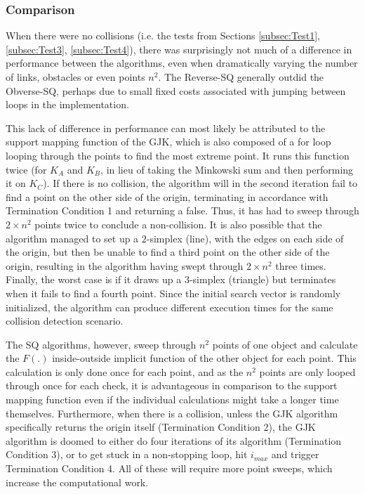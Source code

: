 \subsubsection{Comparison}

When there were no collisions (i.e. the tests from Sections \ref{subsec:Test1}, \ref{subsec:Test3}, \ref{subsec:Test4}), there was surprisingly not much of a difference in performance between the algorithms, even when dramatically varying the number of links, obstacles or even points $n^2$. The Reverse-\gls{SQ} generally outdid the Obverse-\gls{SQ}, perhaps due to small fixed costs associated with jumping between loops in the implementation. 

This lack of difference in performance can most likely be attributed to the support mapping function of the \gls{GJK}, which is also composed of a for loop looping through the points to find the most extreme point. It runs this function twice (for $K_A$ and $K_B$, in lieu of taking the Minkowski sum and then performing it on $K_C$). If there is no collision, the algorithm will in the second iteration fail to find a point on the other side of the origin, terminating in accordance with Termination Condition 1 and returning a false. Thus, it has had to sweep through $2 \times n^2$ points twice to conclude a non-collision. It is also possible that the algorithm managed to set up a $2$-simplex (line), with the edges on each side of the origin, but then be unable to find a third point on the other side of the origin, resulting in the algorithm having swept through $2 \times n^2$ three times. Finally, the worst case is if it draws up a $3$-simplex (triangle) but terminates when it fails to find a fourth point. Since the initial search vector is randomly initialized, the algorithm can produce different execution times for the same collision detection scenario.

The \gls{SQ} algorithms, however, sweep through $n^2$ points of one object and calculate the $F(.)$ inside-outside implicit function of the other object for each point. This calculation is only done once for each point, and as the $n^2$ points are only looped through once for each check, it is advantageous in comparison to the support mapping function even if the individual calculations might take a longer time themselves. Furthermore, when there is a collision, unless the \gls{GJK} algorithm specifically returns the origin itself (Termination Condition 2), the \gls{GJK} algorithm is doomed to either do four iterations of its algorithm (Termination Condition 3), or to get stuck in a non-stopping loop, hit $i_{max}$ and trigger Termination Condition 4. All of these will require more point sweeps, which increase the computational work. 

